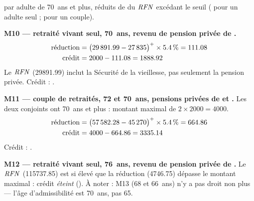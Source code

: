 \pexemples {} par adulte de 70~ans et plus,
réduits de  du $\mathit{RFN}$ excédant le seuil (
pour un adulte seul ;  pour un couple).

\medskip\noindent\textbf{M10 --- retraité vivant seul, 70~ans, revenu de pension privée de .}
\begin{align*}
\text{réduction} &= \bigl(\num{29891.99} - \num{27835}\bigr)^{+} \times \num{5.4}\,\% = \num{111.08} \\
\text{crédit} &= \num{2000} - \num{111.08} = \num{1888.92}
\end{align*}
Le $\mathit{RFN}$ (\num{29891.99}) inclut la Sécurité de la vieillesse, pas seulement
la pension privée. Crédit : .

\medskip\noindent\textbf{M11 --- couple de retraités, 72 et 70~ans, pensions privées de  et .}
Les deux conjoints ont 70~ans et plus : montant maximal de
$2 \times \num{2000} = \num{4000}$.
\begin{align*}
\text{réduction} &= \bigl(\num{57582.28} - \num{45270}\bigr)^{+} \times \num{5.4}\,\% = \num{664.86} \\
\text{crédit} &= \num{4000} - \num{664.86} = \num{3335.14}
\end{align*}
Crédit : .

\medskip\noindent\textbf{M12 --- retraité vivant seul, 76~ans, revenu de pension privée de .}
Le $\mathit{RFN}$ (\num{115737.85}) est si élevé que la réduction
(\num{4746.75}) dépasse le montant maximal : crédit \emph{éteint}
(). À noter : M13 (68 et 66~ans) n'y a pas droit non plus —
l'âge d'admissibilité est 70~ans, pas 65.
